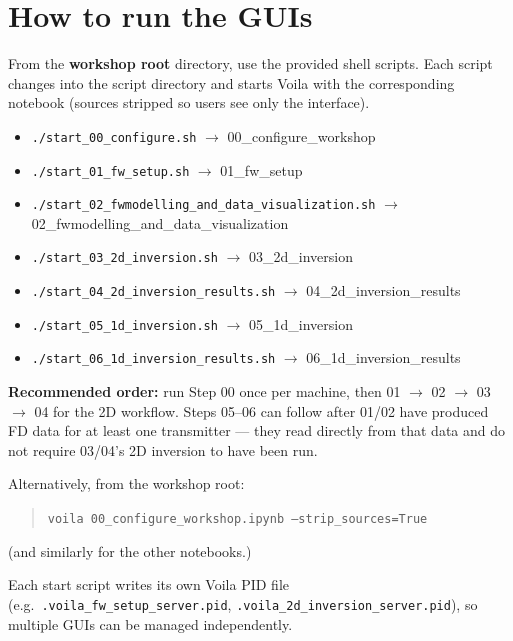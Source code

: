 \documentclass[11pt,a4paper]{article}
\begin{document}
\section{How to run the GUIs}

From the \textbf{workshop root} directory, use the provided shell scripts. Each script changes into the script directory and starts Voila with the corresponding notebook (sources stripped so users see only the interface).

\begin{itemize}
  \item \texttt{./start\_00\_configure.sh} \quad $\to$ 00\_configure\_workshop
  \item \texttt{./start\_01\_fw\_setup.sh} \quad $\to$ 01\_fw\_setup
  \item \texttt{./start\_02\_fwmodelling\_and\_data\_visualization.sh} \quad $\to$ 02\_fwmodelling\_and\_data\_visualization
  \item \texttt{./start\_03\_2d\_inversion.sh} \quad $\to$ 03\_2d\_inversion
  \item \texttt{./start\_04\_2d\_inversion\_results.sh} \quad $\to$ 04\_2d\_inversion\_results
  \item \texttt{./start\_05\_1d\_inversion.sh} \quad $\to$ 05\_1d\_inversion
  \item \texttt{./start\_06\_1d\_inversion\_results.sh} \quad $\to$ 06\_1d\_inversion\_results
\end{itemize}

\textbf{Recommended order:} run Step 00 once per machine, then 01 $\to$ 02 $\to$ 03 $\to$ 04 for the 2D workflow. Steps 05--06 can follow after 01/02 have produced FD data for at least one transmitter — they read directly from that data and do not require 03/04's 2D inversion to have been run.

Alternatively, from the workshop root:
\begin{quote}
  \texttt{voila 00\_configure\_workshop.ipynb --strip\_sources=True}
\end{quote}
(and similarly for the other notebooks.)

Each start script writes its own Voila PID file (e.g.\ \texttt{.voila\_fw\_setup\_server.pid}, \texttt{.voila\_2d\_inversion\_server.pid}), so multiple GUIs can be managed independently.

\end{document}
